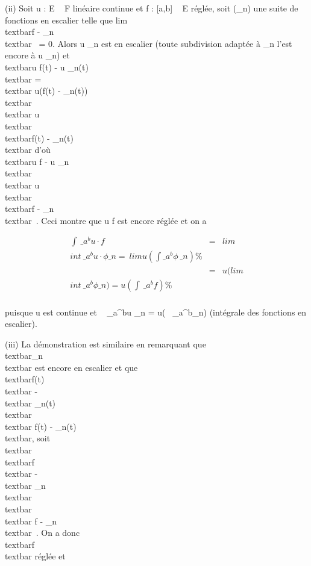 \documentclass[]{article}
\begin{document}
(ii) Soit u : E \rightarrow~ F linéaire continue et f : {[}a,b{]} \rightarrow~ E réglée, soit
(\phi\_n) une suite de fonctions en escalier telle que
lim~\\textbar{}f -
\phi\_n\\textbar{}\infty~ = 0. Alors u \cdot \phi\_n est
en escalier (toute subdivision adaptée à \phi\_n l'est encore à u \cdot
\phi\_n) et \\textbar{}u \cdot f(t) - u \cdot
\phi\_n(t)\\textbar{} =\\textbar{}
u(f(t) - \phi\_n(t))\\textbar{}
\leq\\textbar{}
u\\textbar{}\,\\textbar{}f(t)
- \phi\_n(t)\\textbar{} d'où
\\textbar{}u \cdot f - u \cdot
\phi\_n\\textbar{}\infty~ \leq\\textbar{}
u\\textbar{}\,\\textbar{}f
- \phi\_n\\textbar{}\infty~. Ceci montre que u \cdot f est
encore réglée et on a

\begin{align*} \int ~
\_a^bu \cdot f& =&
lim\\int ~
\_a^bu \cdot \phi\_ n =\
limu(\int  \_a^b\phi~\_
n)\%& \\ & =&
u(lim\\int ~
\_a^b\phi\_ n) = u(\int ~
\_a^bf) \%& \\
\end{align*}

puisque u est continue et \int ~
\_a^bu \cdot \phi\_n = u(\int ~
\_a^b\phi\_n) (intégrale des fonctions en escalier).

(iii) La démonstration est similaire en remarquant que
\\textbar{}\phi\_n\\textbar{} est
encore en escalier et que
\textbar{}\\textbar{}f(t)\\textbar{}
-\\textbar{}
\phi\_n(t)\\textbar{}\textbar{}\leq\\textbar{}
f(t) - \phi\_n(t)\\textbar{}, soit
\\textbar{}\\textbar{}f\\textbar{}
-\\textbar{}
\phi\_n\\textbar{}\\textbar{}\infty~
\leq\\textbar{} f - \phi\_n\\textbar{}\infty~.
On a donc \\textbar{}f\\textbar{} réglée
et
\end{document}
